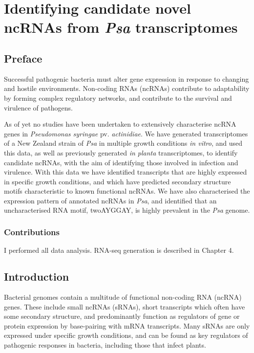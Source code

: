 \chapter{Identifying candidate novel ncRNAs from \textit{Psa} transcriptomes}
\label{chap:psa_ncRNA}

\section{Preface}

Successful pathogenic bacteria must alter gene expression in response to changing and hostile environments. Non-coding RNAs (ncRNAs) contribute to adaptability by forming complex regulatory networks, and contribute to the survival and virulence of pathogens. 

As of yet no studies have been undertaken to extensively characterise ncRNA genes in \textit{Pseudomonas syringae} pv. \textit{actinidiae}. We have generated transcriptomes of a New Zealand strain of \textit{Psa} in multiple growth conditions \textit{in vitro}, and used this data, as well as previously generated \textit{in planta} transcriptomes, to identify candidate ncRNAs, with the aim of identifying those involved in infection and virulence. With this data we have identified transcripts that are highly expressed in specific growth conditions, and which have predicted secondary structure motifs characteristic to known functional ncRNAs. We have also characterised the expression pattern of annotated ncRNAs in \textit{Psa}, and identified that an uncharacterised RNA motif, twoAYGGAY, is highly prevalent in the \textit{Psa} genome.

\subsection{Contributions}
I performed all data analysis. RNA-seq generation is described in Chapter 4.
\newpage


\section{Introduction}

Bacterial genomes contain a multitude of functional non-coding RNA (ncRNA) genes. These include small ncRNAs (sRNAs), short transcripts which often have some secondary structure, and predominantly function as regulators of gene or protein expression by base-pairing with mRNA transcripts. Many sRNAs are only expressed under specific growth conditions, and can be found as key regulators of pathogenic responses in bacteria, including those that infect plants.

